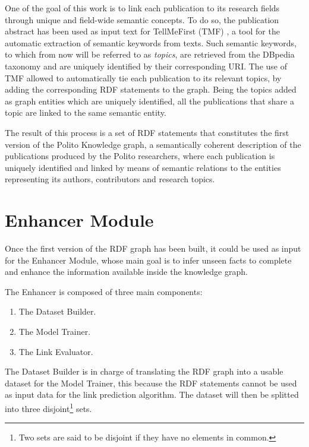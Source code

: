 \documentclass[%
    corpo=13.5pt,
    twoside,
    oldstyle,
    tipotesi=magistrale,
    greek,
    evenboxes
]{toptesi}
\begin{document}
One of the goal of this work is to link each publication to its research
fields through unique and field-wide semantic concepts.
To do so, the publication abstract has been used
as input text for TellMeFirst (TMF) \cite{rocha2015}, a tool for the automatic
extraction of semantic keywords from texts. Such semantic keywords, to which from now
will be referred to as \emph{topics}, are retrieved from the DBpedia taxonomy
and are uniquely identified by their corresponding URI.
The use of TMF allowed to automatically tie each publication to
its relevant topics, by adding the corresponding RDF statements to the graph.
Being the topics added as graph entities which are uniquely identified, all the
publications that share a topic are linked to the same semantic entity.

The result of this process is a set of RDF statements that constitutes the
first version of the Polito Knowledge graph, a semantically coherent description
of the publications produced by the Polito researchers, where each
publication is uniquely identified and linked by means of semantic relations
to the entities representing its authors, contributors and research topics.


\section{Enhancer Module}

Once the first version of the RDF graph has been built, it could be used as
input for the Enhancer Module, whose main goal is to infer unseen facts to
complete and enhance the information available inside the knowledge graph.
\newline

The Enhancer is composed of three main components:

\begin{enumerate}
    \item The Dataset Builder.
    \item The Model Trainer.
    \item The Link Evaluator.
\end{enumerate}

The Dataset Builder is in charge of translating the RDF graph into a usable
dataset for the Model Trainer, this because the RDF statements cannot be used as
input data for the link prediction algorithm.
The dataset will then be splitted into three disjoint\footnote{Two sets are said
to be disjoint if they have no elements in common.}
sets.
\end{document}
